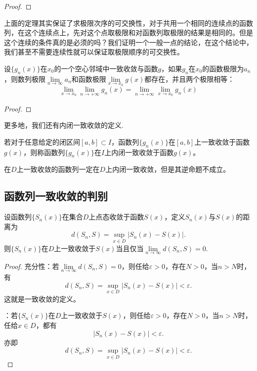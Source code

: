 \begin{proof}
    
\end{proof}

上面的定理其实保证了求极限次序的可交换性，对于共用一个相同的连续点的函数列，在这个连续点上，先对这个点取极限和对函数列取极限的结果是相同的。但是这个连续的条件真的是必须的吗？我们证明一个一般一点的结论，在这个结论中，我们甚至不需要连续性就可以保证取极限顺序的可交换性。

\begin{theorem}
    设\(\{g_n(x)\}\)在\(x_0\)的一个空心邻域中一致收敛与函数\(g\)，如果\(g_n\)在\(x_{0}\)的函数极限为\(a_n\)，则数列极限\(\lim\limits_{n\to\infty}a_n\)和函数极限\(\lim\limits_{x\to x_0}g(x)\)都存在，并且两个极限相等：\[\lim_{x\to x_0}\lim_{n\to +\infty}g_{n}(x) = \lim_{n\to +\infty}\lim_{x\to x_0}g_{n}(x)\]
\end{theorem}
\begin{proof}
    
\end{proof}

更多地，我们还有{\heiti 内闭一致收敛}的定义.
\begin{definition}[内闭一致收敛]
    若对于任意给定的闭区间\([a,b]\subset I\)，函数列\(\{g_n(x)\}\)在\([a,b]\)上一致收敛于函数\(g(x)\)，则称函数列\(\{g_n(x)\}\)在\(I\)上{\heiti 内闭一致收敛}于函数\(g(x)\)。
\end{definition}

在\(D\)上一致收敛的函数列一定在\(D\)上内闭一致收敛，但是其逆命题不成立。

\subsection{函数列一致收敛的判别}

    \begin{theorem}
        设函数列\(\{S_n(x)\}\)在集合\(D\)上点态收敛于函数\(S(x)\)，定义\(S_n(x)\)与\(S(x)\)的距离为\[d(S_n,S) =\sup_{x\in D}\lvert S_n(x) - S(x)\rvert.\]
        则\(\{S_n(x)\}\)在\(D\)上一致收敛于\(S(x)\)当且仅当\(\lim\limits_{n\to\infty}d(S_n,S) = 0\).
    \end{theorem}
    \begin{proof}
        {\heiti 充分性}：若\(\lim\limits_{n\to\infty}d(S_n,S) = 0\)，则任给\(\varepsilon>0\)，存在\(N>0\)，当\(n>N\)时，有\[d(S_n,S) = \sup_{x\in D}\lvert S_n(x) - S(x)\rvert<\varepsilon.\]这就是一致收敛的定义。

        ：若\(\{S_n(x)\}\)在\(D\)上一致收敛于\(S(x)\)，则任给\(\varepsilon>0\)，存在\(N>0\)，当\(n>N\)时，任给\(x\in D\)，都有\[\lvert S_n(x)-S(x)\rvert<\varepsilon.\]
        亦即\[d(S_n,S) =\sup_{x\in D}\lvert S_n(x) - S(x)\rvert<\varepsilon.\]
    \end{proof}

